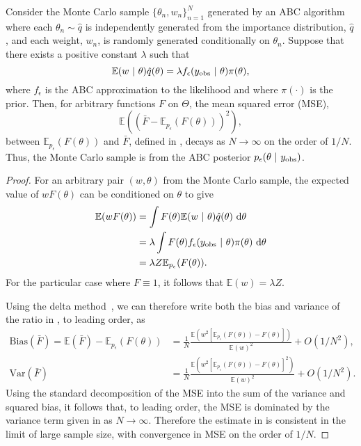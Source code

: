 \documentclass[review,demo]{siamonline190516}
\begin{document}
\begin{lemma}
\label{lemma:MC}
Consider the Monte Carlo sample $\{ \theta_n, w_n \}_{n=1}^N$ generated by an ABC algorithm where each $\theta_n \sim \hat q$ is independently generated from the importance distribution, $\hat q$, and each weight, $w_n$, is randomly generated conditionally on $\theta_n$.
Suppose that there exists a positive constant $\lambda$ such that
\begin{equation}
\label{eq:ABCCondition}
\mathbb E(w~|~\theta) \hat q(\theta) = \lambda f_\epsilon(\obs y~|~\theta) \pi(\theta),
\end{equation}
where $f_\epsilon$ is the ABC approximation to the likelihood and where $\pi(\cdot)$ is the prior.
Then, for arbitrary functions $F$ on $\Theta$, the mean squared error (MSE),
\[
\mathbb E\left( \left( \bar F - \mathbb E_{p_\epsilon} \left(F(\theta) \right) \right)^2 \right),
\]
between $\mathbb E_{p_\epsilon}(F(\theta))$ and $\bar F$, defined in , decays as $N \rightarrow \infty$ on the order of $1/N$.
Thus, the Monte Carlo sample is from the ABC posterior $p_\epsilon(\theta~|~y_{\mathrm{obs}})$.
\end{lemma}
\begin{proof}
For an arbitrary pair $(w, \theta)$ from the Monte Carlo sample, the expected value of $w F(\theta)$ can be conditioned on $\theta$ to give 
\begin{align*}
\mathbb E(w F(\theta)) 
&= \int F(\theta) \mathbb E(w~|~\theta) \hat q(\theta) ~\mathrm d\theta 
\\ 
&= \lambda \int F(\theta) f_\epsilon(y_{\mathrm{obs}}~|~\theta) \pi(\theta) ~\mathrm d\theta 
\\
&= \lambda Z \mathbb E_{p_\epsilon}(F(\theta)).
\end{align*}
For the particular case where $F \equiv 1$, it follows that $\mathbb E(w) = \lambda Z$.

Using the delta method~\cite{Seltman2018}, we can therefore write both the bias and variance of the ratio in , to leading order, as
\begin{subequations}
\label{eq:estimate:MSE}
\begin{align}
\mathrm{Bias}(\bar F) = \mathbb E \left( \bar F \right) - \mathbb E_{p_\epsilon}(F(\theta))
&= 
\frac{1}{N} \frac{\mathbb E \left( w^2 \left[ \mathbb E_{p_\epsilon}(F(\theta)) - F \left(\theta\right) \right] \right)}{\mathbb E(w)^2} + O(1/N^2),
\label{eq:estimate:bias}
\\
\mathrm{Var} \left( \bar F \right)
&=
\frac{1}{N} \frac{\mathbb E \left( w^2 \left[ \mathbb E_{p_\epsilon}(F(\theta)) - F\left(\theta\right) \right]^2 \right) }{\mathbb E(w)^2} + O(1/N^2).
\label{eq:estimate:variance}
\end{align}
\end{subequations}
Using the standard decomposition of the MSE into the sum of the variance and squared bias, it follows that, to leading order, the MSE is dominated by the variance term given in  as $N \rightarrow \infty$.
Therefore the estimate in  is consistent in the limit of large sample size, with convergence in MSE on the order of $1/N$. 
\end{proof}
\end{document}
